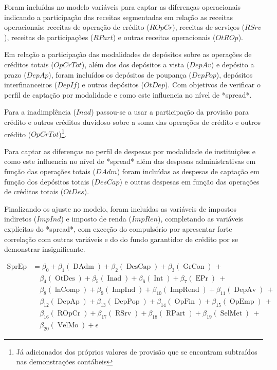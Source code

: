 \documentclass[
  12pt,
  12pt,
  openright,
  oneside,
  a4paper,
  chapter=TITLE,
  section=TITLE,
  subsection=TITLE,
  subsubsection=TITLE,
  english,
  portugues,
  sumario=tradicional]{abntex2}
\begin{document}
\begin{apendicesenv}
Foram incluídas no modelo variáveis  para captar as diferenças operacionais indicando a participação das receitas segmentadas em relação as receitas operacionais: receitas de operação de crédito ($ROpCr$), receitas de serviços ($RSrv$), receitas de participações ($RPart$) e outras receitas operacionais ($OtROp$).

Em relação a participação das modalidades de depósitos sobre as operações de créditos totais ($OpCrTot$), além dos dos depósitos a vista ($DepAv$) e depósito a prazo ($DepAp$),  foram incluídos os depósitos de poupança ($DepPop$), depósitos interfinanceiros ($DepIf$) e outros depósitos ($OtDep$). Com objetivos de verificar o perfil de captação por modalidade e como este influencia no nível de *spread*. 

Para a inadimplência ($Inad$) passou-se a usar a participação da provisão para crédito e outros créditos duvidoso sobre a soma das operações de crédito e outros crédito ($OpCrTot$)\footnote{Já adicionados dos próprios valores de provisão que se encontram subtraídos nas demonstrações contábeis}. 

Para captar as diferenças no perfil de despesas por modalidade de instituições e como este influencia no nível de *spread* além das despesas administrativas em função das operações totais ($DAdm$) foram incluídas as despesas de captação em função dos depósitos totais ($DesCap$) e outras despesas em função das operações de créditos totais ($OtDes$).

Finalizando os ajuste no modelo, foram incluídas as variáveis de impostos indiretos ($ImpInd$) e imposto de renda ($ImpRen$), completando as variáveis explícitas do *spread*, com exceção do compulsório por apresentar forte correlação com outras variáveis e do do fundo garantidor de crédito por se demonstrar insignificante.



\begin{equation}
\begin{aligned}
\operatorname{SprEp} &= \beta_{0} + \beta_{1}(\operatorname{DAdm}) + \beta_{2}(\operatorname{DesCap}) + \beta_{3}(\operatorname{GrCon})\ + \\
&\quad \beta_{4}(\operatorname{OtDes}) + \beta_{5}(\operatorname{Inad}) + \beta_{6}(\operatorname{Int}) + \beta_{7}(\operatorname{EPr})\ + \\
&\quad \beta_{8}(\operatorname{lnComp}) + \beta_{9}(\operatorname{ImpInd}) + \beta_{10}(\operatorname{ImpRend}) + \beta_{11}(\operatorname{DepAv})\ + \\
&\quad \beta_{12}(\operatorname{DepAp}) + \beta_{13}(\operatorname{DepPop}) + \beta_{14}(\operatorname{OpFin}) + \beta_{15}(\operatorname{OpEmp})\ + \\
&\quad \beta_{16}(\operatorname{ROpCr}) + \beta_{17}(\operatorname{RSrv}) + \beta_{18}(\operatorname{RPart}) + \beta_{19}(\operatorname{SelMet})\ + \\
&\quad \beta_{20}(\operatorname{VelMo}) + \epsilon
\end{aligned}
\end{equation}









\end{apendicesenv}
\end{document}
